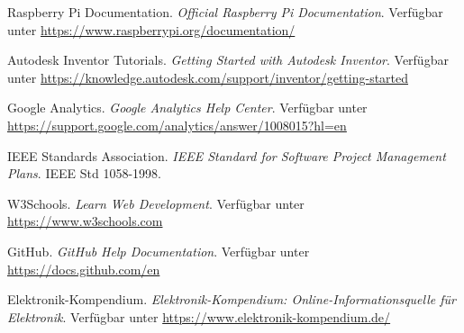 \begin{thebibliography}{9}
    Raspberry Pi Documentation.
    \textit{Official Raspberry Pi Documentation}.
    Verfügbar unter \url{https://www.raspberrypi.org/documentation/}
    
    Autodesk Inventor Tutorials.
    \textit{Getting Started with Autodesk Inventor}.
    Verfügbar unter \url{https://knowledge.autodesk.com/support/inventor/getting-started}
    
    Google Analytics.
    \textit{Google Analytics Help Center}.
    Verfügbar unter \url{https://support.google.com/analytics/answer/1008015?hl=en}
    
    IEEE Standards Association.
    \textit{IEEE Standard for Software Project Management Plans}.
    IEEE Std 1058-1998.
    
    W3Schools.
    \textit{Learn Web Development}.
    Verfügbar unter \url{https://www.w3schools.com}
    
    GitHub.
    \textit{GitHub Help Documentation}.
    Verfügbar unter \url{https://docs.github.com/en}

    Elektronik-Kompendium.
    \textit{Elektronik-Kompendium: Online-Informationsquelle für Elektronik}.
    Verfügbar unter \url{https://www.elektronik-kompendium.de/}
    
\end{thebibliography}
